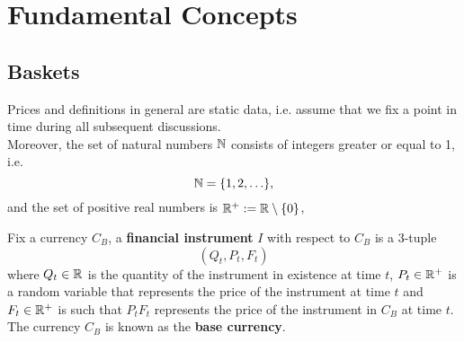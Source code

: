 \documentclass[11pt,fleqn]{book} %
\begin{document}


\pagestyle{empty} %

\tableofcontents %

\cleardoublepage %

\pagestyle{fancy} %





\chapter{Fundamental Concepts}

\section{Baskets}

\begin{remark} \label{rmk:111}
Prices and definitions in general are static data, i.e. assume that we fix a point in time during all
subsequent discussions.\\
Moreover, the set of natural numbers \(\mathbb{N}\) consists of integers greater or equal to 1, i.e.
\[
\mathbb{N} = \{1, 2, \ldots \},
\]
and the set of positive real numbers is \(\mathbb{R}^+ := \mathbb{R} \setminus \{0\}\),
\end{remark}

\begin{definition} \label{def:112}
Fix a currency \(C_B\), a \textbf{financial instrument} \(I\) with respect to \(C_B\) is a 3-tuple
\[
(Q_t, P_t, F_t)
\]
where \(Q_t \in \mathbb{R}\) is the quantity of the instrument in existence at time \(t\), \(P_t \in \mathbb{R}^+\) is a random variable that represents the price of the instrument at time \(t\) and
\(F_t \in \mathbb{R}^+\) is such that \(P_tF_t\) represents the price of the instrument in \(C_B\) at time \(t\).\\
The currency \(C_B\) is known as the \textbf{base currency}.
\end{definition}
\end{document}
